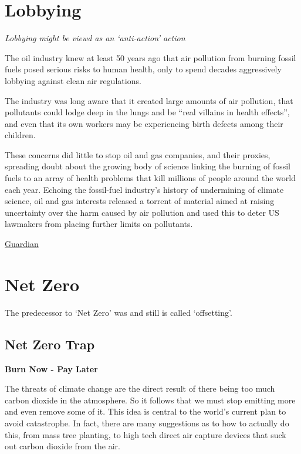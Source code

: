 \documentclass[
]{book}
\begin{document}
\hypertarget{lobbying}{%
\chapter{Lobbying}\label{lobbying}}

\emph{Lobbying might be viewd as an `anti-action' action}

The oil industry knew at least 50 years ago that air pollution from burning fossil fuels posed serious risks to human health, only to spend decades aggressively lobbying against clean air regulations.

The industry was long aware that it created large amounts of air pollution, that pollutants could lodge deep in the lungs and be ``real villains in health effects'', and even that its own workers may be experiencing birth defects among their children.

These concerns did little to stop oil and gas companies, and their proxies, spreading doubt about the growing body of science linking the burning of fossil fuels to an array of health problems that kill millions of people around the world each year. Echoing the fossil-fuel industry's history of undermining of climate science, oil and gas interests released a torrent of material aimed at raising uncertainty over the harm caused by air pollution and used this to deter US lawmakers from placing further limits on pollutants.

\href{https://www.theguardian.com/environment/2021/mar/18/oil-industry-fossil-fuels-air-pollution-documents}{Guardian}

\hypertarget{net-zero-1}{%
\chapter{Net Zero}\label{net-zero-1}}

The predecessor to `Net Zero' was and still is called `offsetting'.

\hypertarget{net-zero-trap}{%
\section{Net Zero Trap}\label{net-zero-trap}}

\textbf{Burn Now - Pay Later}

The threats of climate change are the direct result of there being too much carbon dioxide in the atmosphere. So it follows that we must stop emitting more and even remove some of it. This idea is central to the world's current plan to avoid catastrophe. In fact, there are many suggestions as to how to actually do this, from mass tree planting, to high tech direct air capture devices that suck out carbon dioxide from the air.
\end{document}

